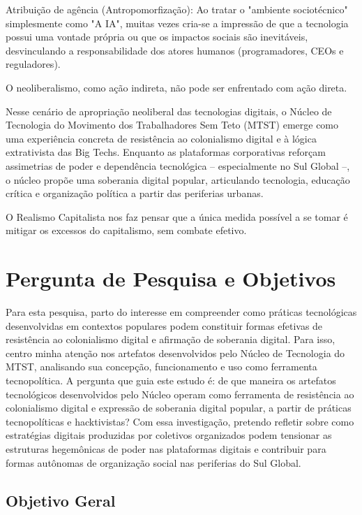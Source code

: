 Atribuição de agência (Antropomorfização): Ao tratar o "ambiente sociotécnico" simplesmente como "A IA", muitas vezes cria-se a impressão de que a tecnologia possui uma vontade própria ou que os impactos sociais são inevitáveis, desvinculando a responsabilidade dos atores humanos (programadores, CEOs e reguladores).

O neoliberalismo, como ação indireta, não pode ser enfrentado com ação direta.

Nesse cenário de apropriação neoliberal das tecnologias digitais, o Núcleo de Tecnologia do Movimento dos Trabalhadores Sem Teto (MTST) emerge como uma experiência concreta de resistência ao colonialismo digital e à lógica extrativista das Big Techs. Enquanto as plataformas corporativas reforçam assimetrias de poder e dependência tecnológica – especialmente no Sul Global –, o núcleo propõe uma soberania digital popular, articulando tecnologia, educação crítica e organização política a partir das periferias urbanas.

O Realismo Capitalista nos faz pensar que a única medida possível a se tomar é mitigar os excessos do capitalismo, sem combate efetivo.
\section{Pergunta de Pesquisa e Objetivos}
\label{sec:perg}
Para esta pesquisa, parto do interesse em compreender como práticas tecnológicas desenvolvidas em contextos populares podem constituir formas efetivas de resistência ao colonialismo digital e afirmação de soberania digital. Para isso, centro minha atenção nos artefatos desenvolvidos pelo Núcleo de Tecnologia do MTST, analisando sua concepção, funcionamento e uso como ferramenta tecnopolítica. A pergunta que guia este estudo é: de que maneira os artefatos tecnológicos desenvolvidos pelo Núcleo operam como ferramenta de resistência ao colonialismo digital e expressão de soberania digital popular, a partir de práticas tecnopolíticas e hacktivistas? Com essa investigação, pretendo refletir sobre como estratégias digitais produzidas por coletivos organizados podem tensionar as estruturas hegemônicas de poder nas plataformas digitais e contribuir para formas autônomas de organização social nas periferias do Sul Global.

\subsection{Objetivo Geral}
\label{subsec:objGer}


